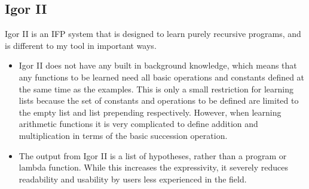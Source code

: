 \subsection{Igor II}
Igor II is an IFP system that is designed to learn purely recursive programs, and is different to my tool in important ways.
\begin{itemize}
\item Igor II does not have any built in background knowledge, which means that any functions to be learned need all basic operations and constants defined at the same time as the examples. This is only a small restriction for learning lists because the set of constants and operations to be defined are limited to the empty list and list prepending respectively. However, when learning arithmetic functions it is very complicated to define addition and multiplication in terms of the basic succession operation.
\item The output from Igor II is a list of hypotheses, rather than a program or lambda function. While this increases the expressivity, it severely reduces readability and usability by users less experienced in the field.
\end{itemize}


\pagebreak
%
%